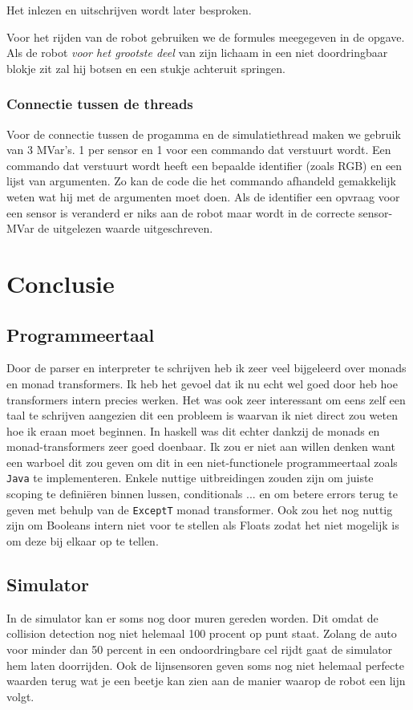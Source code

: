 \documentclass[12pt, titlepage]{article}
\begin{document}
Het inlezen en uitschrijven wordt later besproken.

Voor het rijden van de robot gebruiken we de formules meegegeven in de opgave. 
Als de robot \emph{voor het grootste deel} van zijn lichaam in een niet doordringbaar blokje zit zal hij botsen en een stukje achteruit springen.

\subsubsection{Connectie tussen de threads}
\label{ssub:connectie_tussen_de_threads}
Voor de connectie tussen de progamma en de simulatiethread maken we gebruik van 3 MVar's.
1 per sensor en 1 voor een commando dat verstuurt wordt.
Een commando dat verstuurt wordt heeft een bepaalde identifier (zoals RGB) en een lijst van argumenten. Zo kan de code die het commando afhandeld gemakkelijk weten wat hij met de argumenten moet doen.
Als de identifier een opvraag voor een sensor is veranderd er niks aan de robot maar wordt in de correcte sensor-MVar de uitgelezen waarde uitgeschreven.

\newpage
\section{Conclusie}
\label{sec:conclusie}

\subsection{Programmeertaal}
\label{sub:programmeertaal}
Door de parser en interpreter te schrijven heb ik zeer veel bijgeleerd over monads en monad transformers. Ik heb het gevoel dat ik nu echt wel goed door heb hoe transformers intern precies werken. Het was ook zeer interessant om eens zelf een taal te schrijven aangezien dit een probleem is waarvan ik niet direct zou weten hoe ik eraan moet beginnen. In haskell was dit echter dankzij de monads en monad-transformers zeer goed doenbaar. Ik zou er niet aan willen denken want een warboel dit zou geven om dit in een niet-functionele programmeertaal zoals \texttt{Java} te implementeren. Enkele nuttige uitbreidingen zouden zijn om juiste scoping te definiëren binnen lussen, conditionals ... en om betere errors terug te geven met behulp van de \texttt{ExceptT} monad transformer. Ook zou het nog nuttig zijn om Booleans intern niet voor te stellen als Floats zodat het niet mogelijk is om deze bij elkaar op te tellen.

\subsection{Simulator}
\label{sub:simulator}
In de simulator kan er soms nog door muren gereden worden. Dit omdat de collision detection nog niet helemaal 100 procent op punt staat. Zolang de auto voor minder dan 50 percent in een ondoordringbare cel rijdt gaat de simulator hem laten doorrijden. Ook de lijnsensoren geven soms nog niet helemaal perfecte waarden terug wat je een beetje kan zien aan de manier waarop de robot een lijn volgt.
\end{document}
